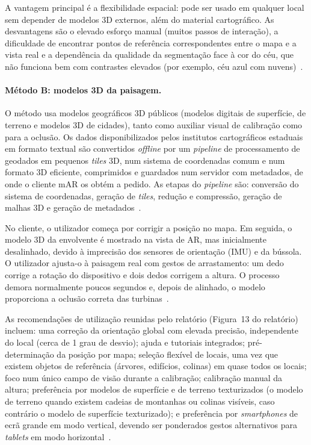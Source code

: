 A vantagem principal é a flexibilidade espacial: pode ser usado em qualquer local sem depender de modelos 3D externos, além do material cartográfico. As desvantagens são o elevado esforço manual (muitos passos de interação), a dificuldade de encontrar pontos de referência correspondentes entre o mapa e a vista real e a dependência da qualidade da segmentação face à cor do céu, que não funciona bem com contrastes elevados (por exemplo, céu azul com nuvens)~\cite[Sec.~2.2.2.2]{ar4wind2023}.

\paragraph{Método B: modelos 3D da paisagem.}
\label{sec:ar4wind_metodoB}
O método usa modelos geográficos 3D públicos (modelos digitais de superfície, de terreno e modelos 3D de cidades), tanto como auxiliar visual de calibração como para a oclusão. Os dados disponibilizados pelos institutos cartográficos estaduais em formato textual são convertidos \textit{offline} por um \textit{pipeline} de processamento de geodados em pequenos \textit{tiles} 3D, num sistema de coordenadas comum e num formato 3D eficiente, comprimidos e guardados num servidor com metadados, de onde o cliente mAR os obtém a pedido. As etapas do \textit{pipeline} são: conversão do sistema de coordenadas, geração de \textit{tiles}, redução e compressão, geração de malhas 3D e geração de metadados~\cite[Sec.~2.2.2.3, Fig.~11]{ar4wind2023}.

No cliente, o utilizador começa por corrigir a posição no mapa. Em seguida, o modelo 3D da envolvente é mostrado na vista de AR, mas inicialmente desalinhado, devido à imprecisão dos sensores de orientação (IMU) e da bússola. O utilizador ajusta-o à paisagem real com gestos de arrastamento: um dedo corrige a rotação do dispositivo e dois dedos corrigem a altura. O processo demora normalmente poucos segundos e, depois de alinhado, o modelo proporciona a oclusão correta das turbinas~\cite[Sec.~2.2.2.3, Fig.~12]{ar4wind2023}.

As recomendações de utilização reunidas pelo relatório (Figura~13 do relatório) incluem: uma correção da orientação global com elevada precisão, independente do local (cerca de 1 grau de desvio); ajuda e tutoriais integrados; pré-determinação da posição por mapa; seleção flexível de locais, uma vez que existem objetos de referência (árvores, edifícios, colinas) em quase todos os locais; foco num único campo de visão durante a calibração; calibração manual da altura; preferência por modelos de superfície e de terreno texturizados (o modelo de terreno quando existem cadeias de montanhas ou colinas visíveis, caso contrário o modelo de superfície texturizado); e preferência por \textit{smartphones} de ecrã grande em modo vertical, devendo ser ponderados gestos alternativos para \textit{tablets} em modo horizontal~\cite[Fig.~13]{ar4wind2023}.

